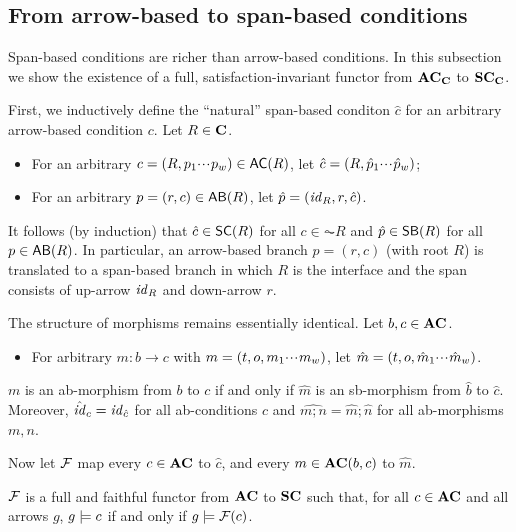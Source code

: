 \subsection{From arrow-based to span-based conditions}

Span-based conditions are richer than arrow-based conditions. In this subsection we show the existence of a full, satisfaction-invariant functor from $\mathbf{AC}_{\mathbf{C}}$ to $\mathbf{SC}_{\mathbf{C}}$.

First, we inductively define the ``natural'' span-based conditon $\hat c$ for an arbitrary arrow-based condition $c$. Let $R\in\mathbf{C}$.
\begin{itemize}
\item For an arbitrary $c=(R,p_1\ccdots p_w)\in \AC R$, let $\hat c=(R,\hat p_1{\cdotp\mkern-2mu\cdotp\mkern-2mu\cdotp\mkern1mu} \hat p_w)$; 
\item For an arbitrary $p=(r,c)\in \AB R$, let $\hat p=(\mathit{id}_R,r,\hat c)$.
\end{itemize}
%
It follows (by induction) that $\hat c\in \SC R$ for all $c\in \AC R$ and $\hat p\in \SB R$ for all $p\in \AB R$. In particular, an arrow-based branch $p=(r,c)$ (with root $R$) is translated to a span-based branch in which $R$ is the interface and the span consists of up-arrow $\mathit{id}_R$ and down-arrow $r$.

The structure of morphisms remains essentially identical. Let $b,c\in \mathbf{AC}$.
%
\begin{itemize}
\item For arbitrary $m:b\to c$ with $m=(t,o,m_1{\cdotp\mkern-2mu\cdotp\mkern-2mu\cdotp\mkern1mu} m_w)$, let $\hat m=(t,o,\hat m_1{\cdotp\mkern-2mu\cdotp\mkern-2mu\cdotp\mkern1mu} \hat m_w)$.
\end{itemize}
%
\begin{proposition}
$m$ is an ab-morphism from $b$ to $c$ if and only if $\hat m$ is an sb-morphism from $\hat b$ to $\hat c$. Moreover, $\hat {\mathit{id}}_c=\mathit{id}_{\hat c}$ for all ab-conditions $c$ and $\widehat{m;n}=\hat m;\hat n$ for all ab-morphisms $m,n$.
\end{proposition}
%
Now let $\mathcal{F}$ map every $c\in \mathbf{AC}$ to $\hat c$, and every $m\in \mathbf{AC}(b,c)$ to $\hat m$.

\begin{theorem}
$\mathcal{F}$ is a full and faithful functor from $\mathbf{AC}$ to $\mathbf{SC}$ such that, for all $c\in \mathbf{AC}$ and all arrows $g$, $g\models c$ if and only if $g\models \mathcal{F}(c)$.
\end{theorem}




